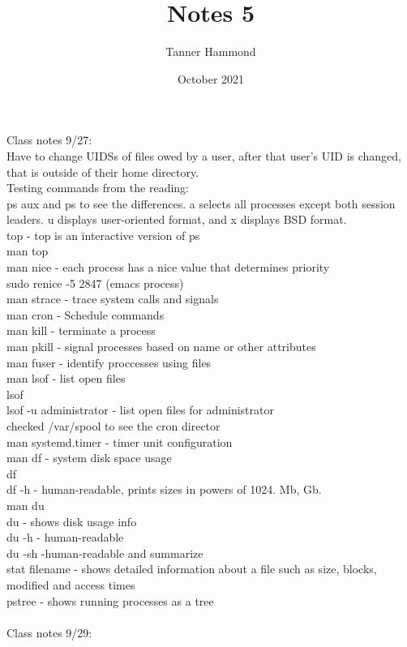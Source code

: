 \documentclass{article}
\title{Notes 5}
\author{Tanner Hammond}
\date{October 2021}
\begin{document}
\maketitle

Class notes 9/27:\\
Have to change UIDSs of files owed by a user, after that user's UID is changed, that is outside of their home directory.\\
Testing commands from the reading:\\
ps aux and ps to see the differences. a selects all processes except both session leaders. u displays user-oriented format, and x displays BSD format. \\
top - top is an interactive version of ps\\
man top\\
man nice - each process has a nice value that determines priority\\
sudo renice -5 2847 (emacs process)\\
man strace - trace system calls and signals\\
man cron - Schedule commands\\
man kill - terminate a process\\
man pkill - signal processes based on name or other attributes\\
man fuser - identify proccesses using files\\
man lsof - list open files\\
lsof \\
lsof -u administrator - list open files for administrator\\
checked /var/spool to see the cron director\\
man systemd.timer - timer unit configuration\\
man df - system disk space usage\\
df\\
df -h - human-readable, prints sizes in powers of 1024. Mb, Gb.\\
man du\\
du - shows disk usage info\\
du -h - human-readable\\
du -sh -human-readable and summarize\\
stat filename - shows detailed information about a file such as size, blocks, modified and access times\\
pstree - shows running processes as a tree\\
\\
Class notes 9/29:\\
\end{document}
